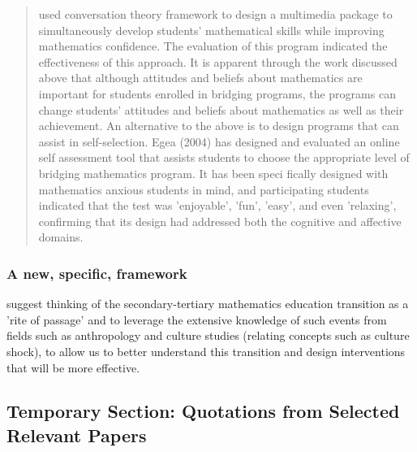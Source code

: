 \documentclass[twoside,12pt,a4paper]{report}
\begin{document}
\begin{quote}
\cite{Taylor2006} used conversation theory framework to design a
multimedia package to simultaneously develop students' mathematical skills while
improving mathematics confidence. The evaluation of this program indicated the
effectiveness of this approach. It is apparent through the work discussed above that
although attitudes and beliefs about mathematics are important for students
enrolled in bridging programs, the programs can change students' attitudes and
beliefs about mathematics as well as their achievement. An alternative to the above
is to design programs that can assist in self-selection. Egea (2004) has designed
and evaluated an online self assessment tool that assists students to choose the
appropriate level of bridging mathematics program. It has been speci fically
designed with mathematics anxious students in mind, and participating students
indicated that the test was 'enjoyable', 'fun', 'easy', and even 'relaxing',
confirming that its design had addressed both the cognitive and affective domains.
\end{quote}




\subsubsection{A new, specific, framework}

 suggest thinking of the secondary-tertiary mathematics education transition as a 'rite of passage' and to leverage the extensive knowledge of such events from fields such as anthropology and culture studies (relating concepts such as culture shock), to allow us to better understand this transition and design interventions that will be more effective.


\subsection{Temporary Section: Quotations from Selected Relevant Papers}
\end{document}

